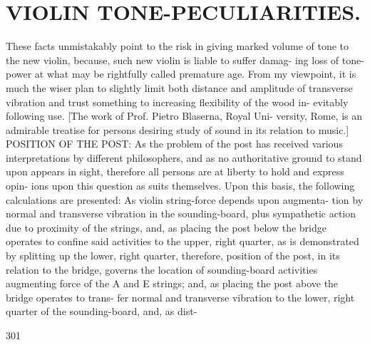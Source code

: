 \documentclass{article}
\begin{document}
\section*{VIOLIN TONE-PECULIARITIES.}
These facts unmistakably point to the risk in giving marked volume of tone to the new violin, because, such new violin is liable to suffer damag- ing loss of tone-power at what may be rightfully called premature age. From my viewpoint, it is much the wiser plan to slightly limit both distance and amplitude of transverse vibration and trust something to increasing flexibility of the wood in- evitably following use. [The work of Prof. Pietro Blaserna, Royal Uni- versity, Rome, is an admirable treatise for persons desiring study of sound in its relation to music.] POSITION OF THE POST: As the problem of the post has received various interpretations by different philosophers, and as no authoritative ground to stand upon appears in sight, therefore all persons are at liberty to hold and express opin- ions upon this question as suits themselves. Upon this basis, the following calculations are presented: As violin string-force depends upon augmenta- tion by normal and transverse vibration in the sounding-board, plus sympathetic action due to proximity of the strings, and, as placing the post below the bridge operates to confine said activities to the upper, right quarter, as is demonstrated by splitting up the lower, right quarter, therefore, position of the post, in its relation to the bridge, governs the location of sounding-board activities augmenting force of the A and E strings; and, as placing the post above the bridge operates to trans- fer normal and transverse vibration to the lower, right quarter of the sounding-board, and, as dist-

301
\end{document}
